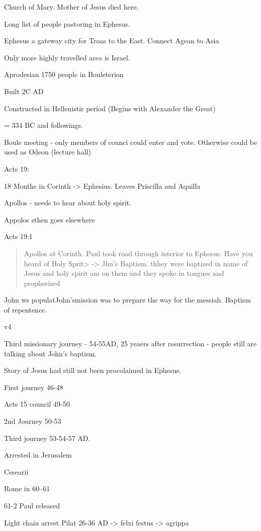 \documentclass[
]{book}
\begin{document}
Church of Mary. Mother of Jesus died here.

Long list of people pastoring in Ephesus.

Ephesus a gateway city for Troas to the East. Connect Agean to Asia

Only more highly travelled area is Israel.

Aprodesian 1750 people in Bouleterion

Built 2C AD

Constructed in Hellenistir period (Begins with Alexander the Great)

= 334 BC and followings.

Boule meeting - only members of counci could enter and vote. Otherwise could be used as Odeon (lecture hall)

Acts 19:

18 Months in Corinth -\textgreater{} Ephesius. Leaves Priscilla and Aquilla

Apollos - needs to hear about holy spirit.

Appolos sthen goes elsewhere

Acts 19:1

\begin{quote}
Apollos at Corinth. Paul took road through interior to Ephesus. Have you heard of Holy Sprit\textgreater{} -\textgreater{} Jhn's Baptism. thhey were baptized in name of Jesus and holy spirit am on them and they spoke in tongues and prophesized
\end{quote}

John ws populatJohn'smission was to prepare the way for the messiah. Baptism of repentence.

v4

Third missionary journey - 54-55AD, 25 yeaers after resurrection - people still are talking about John's baptism.

Story of Jesus had still not been procolaimed in Ephesus.

First journey 46-48

Acts 15 council 49-50

2nd Journey 50-53

Third journey 53-54-57 AD.

Arrested in Jerusalem

Cesearii

Rome in 60--61

61-2 Paul released

Light chain arrest Pilat 26-36 AD -\textgreater{} felxi festus -\textgreater{} agrippa
\end{document}
